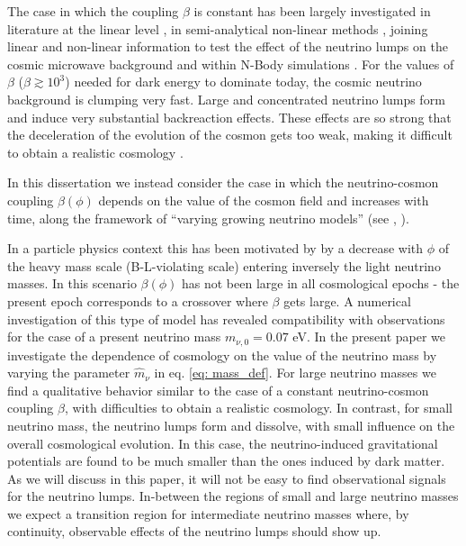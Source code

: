 The case in which the coupling $\beta$ is constant has been largely
investigated in literature at the linear level \cite{mota_neutrino_2008},
in semi-analytical non-linear methods \cite{wintergerst_clarifying_2010,wintergerst_very_2010,brouzakis_nonlinear_2011},
joining linear and non-linear information to test the effect of the
neutrino lumps on the cosmic microwave background \cite{pettorino_neutrino_2010}
and within N-Body simulations \cite{ayaita_neutrino_2013,ayaita_structure_2012,baldi_oscillating_2011,ayaita_nonlinear_2016}.
For the values of $\beta$ ($\beta\gtrsim10^{3}$) needed for dark
energy to dominate today, the cosmic neutrino background is clumping
very fast. Large and concentrated neutrino lumps form and induce very
substantial backreaction effects. These effects are so strong that
the deceleration of the evolution of the cosmon gets too weak, making
it difficult to obtain a realistic cosmology \cite{fuhrer_backreaction_2015}.

In this dissertation we instead consider the case in which the neutrino-cosmon
coupling $\beta(\phi)$ depends on the value of the cosmon field and
increases with time, along the framework of ``varying growing neutrino models''
(see \cite{wetterich_growing_2007}, ). 

In a particle physics context this has been motivated by 
\cite{wetterich_growing_2007} by a decrease with $\phi$ of the heavy
mass scale (B-L-violating scale) entering inversely the light neutrino
masses. In this scenario $\beta(\phi)$ has not been large in all
cosmological epochs - the present epoch corresponds to a crossover
where $\beta$ gets large. A numerical investigation \cite{baldi_oscillating_2011}
of this type of model has revealed compatibility with observations
for the case of a present neutrino mass $m_{\nu,0}=0.07$ eV. In the
present paper we investigate the dependence of cosmology on the value
of the neutrino mass by varying the parameter $\hat{m}_{\nu}$ in
eq. \ref{eq: mass_def}. For large neutrino masses we find a
qualitative behavior similar to the case of a constant neutrino-cosmon
coupling $\beta$, with difficulties to obtain a realistic cosmology.
In contrast, for small neutrino mass, the neutrino lumps form and
dissolve, with small influence on the overall cosmological evolution.
In this case, the neutrino-induced gravitational potentials are found
to be much smaller than the ones induced by dark matter. As we will
discuss in this paper, it will not be easy to find observational signals
for the neutrino lumps. In-between the regions of small and large
neutrino masses we expect a transition region for intermediate neutrino
masses where, by continuity, observable effects of the neutrino lumps
should show up.

